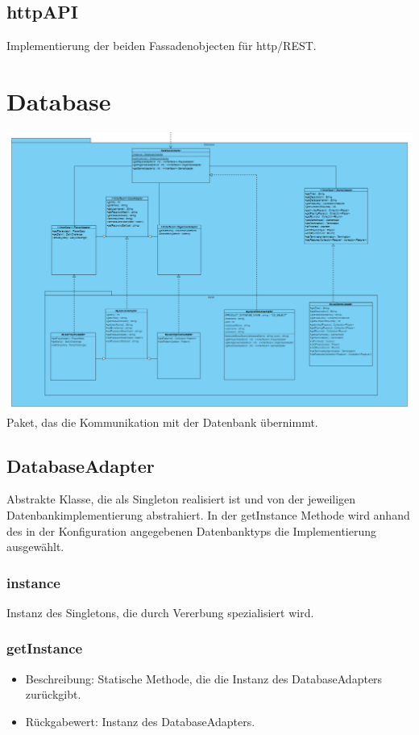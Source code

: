 \documentclass[a4paper]{scrreprt}
\begin{document}
	\subsection{httpAPI}
	Implementierung der beiden Fassadenobjecten für http/REST.

	\section{Database}
	\includegraphics[width=\textwidth]{img/Database.PNG}
	Paket, das die Kommunikation mit der Datenbank übernimmt.

	\subsection{DatabaseAdapter}
	Abstrakte Klasse, die als Singleton realisiert ist und von der jeweiligen Datenbankimplementierung abstrahiert.
	In der getInstance Methode wird anhand des in der Konfiguration angegebenen Datenbanktyps die Implementierung ausgewählt.

	\subsubsection{instance}
	Instanz des Singletons, die durch Vererbung spezialisiert wird.

	\subsubsection{getInstance}
	\begin{itemize}
		\item Beschreibung: Statische Methode, die die Instanz des DatabaseAdapters zurückgibt.
		\item Rückgabewert: Instanz des DatabaseAdapters.
	\end{itemize}
\end{document}
